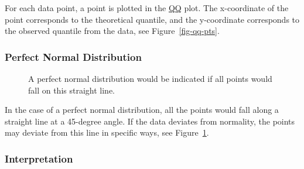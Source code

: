 \documentclass[
  a4paper,
]{scrbook}
\begin{document}
For each data point, a point is plotted in the \hyperref[qq]{QQ} plot.
The x-coordinate of the point corresponds to the theoretical quantile,
and the y-coordinate corresponds to the observed quantile from the data,
see Figure~\ref{fig-qq-pts}.

\subsubsection{Perfect Normal
Distribution}\label{perfect-normal-distribution}

\begin{figure}[H]


\caption{\label{fig-qq-abline}A perfect normal distribution would be
indicated if all points would fall on this straight line.}

\end{figure}%

In the case of a perfect normal distribution, all the points would fall
along a straight line at a 45-degree angle. If the data deviates from
normality, the points may deviate from this line in specific ways, see
Figure~\ref{fig-qq-abline}.

\subsubsection{Interpretation}\label{interpretation}
\end{document}

